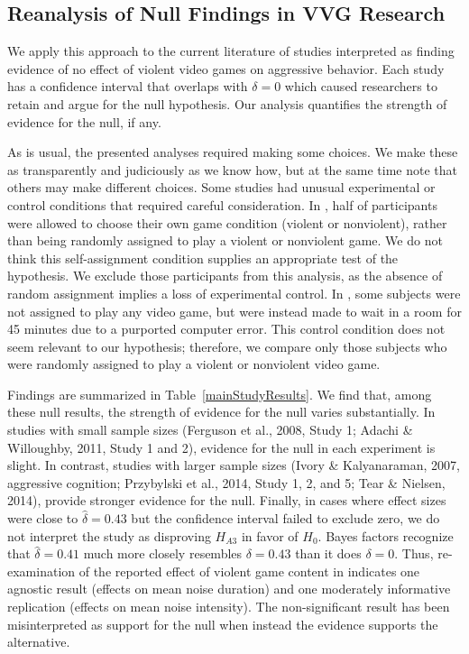 \documentclass[man]{apa6}
\begin{document}
\subsection{Reanalysis of Null Findings in VVG Research}
We apply this approach to the current literature of studies interpreted as finding evidence of no effect of violent video games on aggressive behavior. Each study has a confidence interval that overlaps with $\delta = 0$ which caused researchers to retain and argue for the null hypothesis. Our analysis quantifies the strength of evidence for the null, if any.

As is usual, the presented analyses required making some choices. We make these as transparently and judiciously as we know how, but at the same time note that others may make different choices. Some studies had unusual experimental or control conditions that required careful consideration. In \citet{Ferguson:etal:2008}, half of participants were allowed to choose their own game condition (violent or nonviolent), rather than being randomly assigned to play a violent or nonviolent game. We do not think this self-assignment condition supplies an appropriate test of the hypothesis. We exclude those participants from this analysis, as the absence of random assignment implies a loss of experimental control. In \citet{Ferguson:Rueda:2010}, some subjects were not assigned to play any video game, but were instead made to wait in a room for 45 minutes due to a purported computer error. This control condition does not seem relevant to our hypothesis; therefore, we compare only those subjects who were randomly assigned to play a violent or nonviolent video game. 

Findings are summarized in Table~\ref{mainStudyResults}. We find that, among these null results, the strength of evidence for the null varies substantially. In studies with small sample sizes (Ferguson et al., 2008, Study 1; Adachi \& Willoughby, 2011, Study 1 and 2), evidence for the null in each experiment is slight. 
In contrast, studies with larger sample sizes (Ivory \& Kalyanaraman, 2007, aggressive cognition; Przybylski et al., 2014, Study 1, 2, and 5; Tear \& Nielsen, 2014), \nocite{Ivory:Kalyanaraman:2007,Przybylski:etal:2014,Tear:Nielsen:2014} provide stronger evidence for the null.	Finally, in cases where effect sizes were close to $\hat{\delta} = 0.43$ but the confidence interval failed to exclude zero, we do not interpret the study as disproving $H_{A3}$ in favor of $H_0$. Bayes factors recognize that $\hat{\delta} = 0.41$ much more closely resembles $\delta = 0.43$ than it does $\delta = 0$. Thus, re-examination of the reported effect of violent game content in \citet{Elson:etal:2013} indicates one agnostic result (effects on mean noise duration) and one moderately informative replication (effects on mean noise intensity). The non-significant result has been misinterpreted as support for the null when instead the evidence supports the alternative.  
\end{document}
